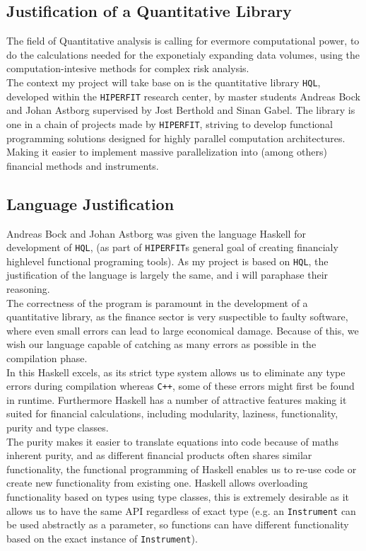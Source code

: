 \documentclass{article}
\newcommand{\HF}{\texttt{HIPERFIT}}
\newcommand{\HQL}{\texttt{HQL}}
\newcommand{\Cpp}{\texttt{C++}}
\begin{document}
\subsection{Justification of a Quantitative Library}
The field of Quantitative analysis is calling for evermore computational power, to
do the calculations needed for the exponetialy expanding data volumes, using the 
computation-intesive methods for complex risk analysis.\\
The context my project will take base on is the quantitative library \HQL\cite{HQL},
developed within the \HF\cite{HF} research center, by master students Andreas Bock 
and Johan Astborg supervised by Jost Berthold and Sinan Gabel. 
The library is one in a chain of projects made by \HF, striving to develop 
functional programming solutions designed for highly parallel computation architectures.
Making it easier to implement massive parallelization into (among others) financial 
methods and instruments\cite{FHPH}.

\subsection{Language Justification}
Andreas Bock and Johan Astborg was given the language Haskell for development of \HQL\cite{HQL},
(as part of \HF s general goal of creating financialy highlevel functional programing tools\cite{HF}). 
As my project is based on \HQL, the justification of the language is largely the same, and i will paraphase their reasoning.\\
The correctness of the program is paramount in the development of a quantitative library, as 
the finance sector is very suspectible to faulty software, where even small errors
can lead to large economical damage. Because of this, we wish our language capable
of catching as many errors as possible in the compilation phase. \\
In this Haskell excels, as its strict type system allows us to eliminate any type errors during compilation
whereas \Cpp, some of these errors might first be found in runtime.
Furthermore Haskell has a number of attractive features making it suited
for financial calculations, including modularity\cite{WFM}, laziness\cite{Cc}, functionality, purity and type classes.\\
The purity makes it easier to translate equations into code because of maths inherent purity,
and as different financial products often shares similar functionality, the functional 
programming of Haskell enables us to re-use code or create new functionality from existing one.
Haskell allows overloading functionality based on types using type classes, this is extremely desirable
as it allows us to have the same API regardless of exact type (e.g. an \texttt{Instrument} can be used abstractly 
as a parameter, so functions can have different functionality based on the exact instance of \texttt{Instrument}).
\end{document}
